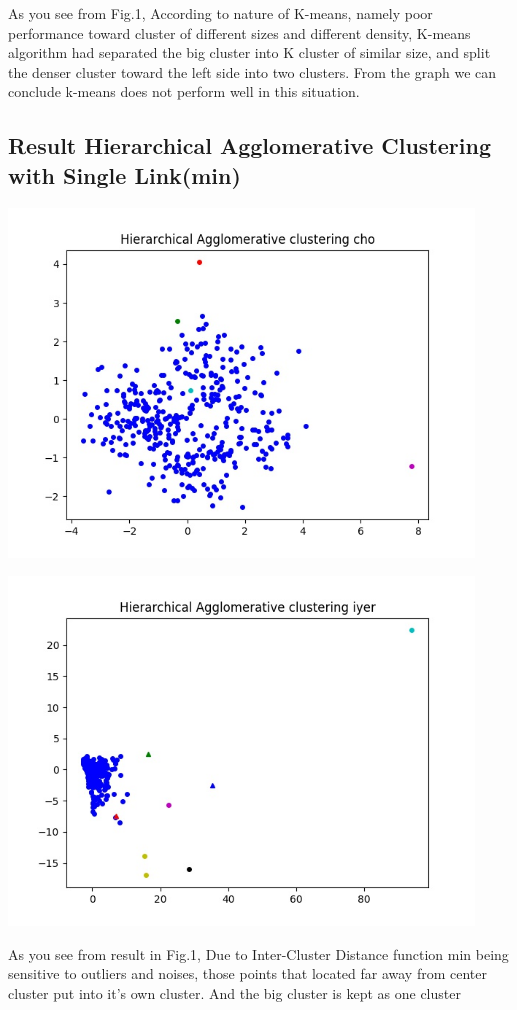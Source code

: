 \documentclass[fleqn]{llncs}
\begin{document}
As you see from Fig.1, According to nature of K-means, namely poor performance toward cluster of different sizes and different density, K-means algorithm had separated the big cluster into K cluster of similar size, and split the denser cluster toward the left side into two clusters. From the graph we can conclude k-means does not perform well in this situation.

\subsection{Result Hierarchical Agglomerative Clustering with Single Link(min)}

\includegraphics[width=350pt]{hiercho.jpg}

\includegraphics[width=350pt]{hieriyer.jpg}

As you see from result in Fig.1, Due to Inter-Cluster Distance function min being sensitive to outliers and noises, those points that located far away from center cluster put into it's own cluster. And the big cluster is kept as one cluster
\end{document}
